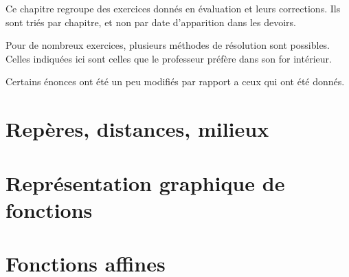 
\begin{center}
    Ce chapitre regroupe des exercices donnés en évaluation et leurs corrections. Ils sont triés par chapitre, et non par date d'apparition dans les devoirs.

    Pour de nombreux exercices, plusieurs méthodes de résolution sont possibles. Celles indiquées ici sont celles que le professeur préfère dans son for intérieur.    
\end{center}
Certains énonces ont été un peu modifiés par rapport a ceux qui ont été donnés.


\section{Repères, distances, milieux}


\section{Représentation graphique de fonctions}


\section{Fonctions affines}


